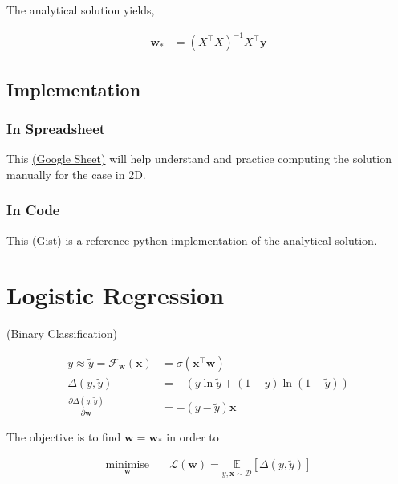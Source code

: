 \documentclass[11pt]{article}
\begin{document}
The analytical solution yields,

\begin{align*}
  \mathbf{w}_* &= (X^{\top}X)^{-1}X^{\top}\mathbf{y}
\end{align*}

\subsection{Implementation}
\label{sec:org1575a7a}

\subsubsection{In Spreadsheet}
\label{sec:org3220788}
This \href{https://docs.google.com/spreadsheets/d/1MrwsA75WUano\_aKpeOibALiCOumbdiQv-609A6fEC-c/edit?usp=sharing}{(Google Sheet)} will help understand and practice
computing the solution manually for the case in 2D.
\subsubsection{In Code}
\label{sec:orge84ca64}
This \href{https://gist.github.com/bvraghav/4b81c850cd7f3c9784493a465ba592ca}{(Gist)} is a reference python implementation of the
analytical solution.


\section{Logistic Regression}
\label{sec:orga38d2a2}

(Binary Classification)

\begin{align*}
  y \approx \widetilde{y} = \mathcal{F}_{\mathbf{w}}(\mathbf{x})
  &= \sigma(\mathbf{x}^{\top}\mathbf{w}) \\
  \Delta\left(y, \widetilde{y} \right)
  &= -\left(y\ln \widetilde{y} + (1-y)
    \ln (1-\widetilde{y})\right) \\
  \frac{\partial \Delta(y,\widetilde{y})} {\partial
  \mathbf{w}}
  &= -(y-\widetilde{y})\mathbf{x}
\end{align*}

The objective is to find \(\mathbf{w}=\mathbf{w}_*\) in
order to

\begin{align*}
  \underset{\mathbf{w}}{\text{minimise}}
  &\quad \mathcal{L}(\mathbf{w}) = \underset{y,
    \mathbf{x} \sim \mathcal{D}}{\mathbb{E}}
    \left[ \Delta\left(y, \widetilde{y} \right) \right]
\end{align*}
\end{document}
